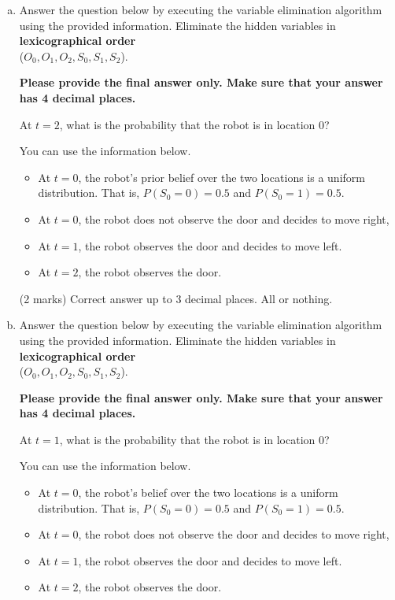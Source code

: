 \documentclass[12pt]{article}
\begin{document}
\begin{enumerate}[(a)]
\item 
\label{q1_filtering}
Answer the question below by executing the variable elimination algorithm using the provided information. 
Eliminate the hidden variables in {\bf lexicographical order} \\
($O_0, O_1, O_2, S_0, S_1, S_2$). 

{\bf Please provide the final answer only. Make sure that your answer has 4 decimal places.}

\begin{problem}
At $t=2$, what is the probability that the robot is in location $0$? 

You can use the information below.
\begin{itemize}
    \item At $t=0$, the robot's prior belief over the two locations is a uniform distribution. That is, $P(S_0 = 0) = 0.5$ and $P(S_0 = 1) = 0.5$.
    \item At $t=0$, the robot does not observe the door and decides to move right, 
    \item At $t=1$, the robot observes the door and decides to move left.
    \item At $t=2$, the robot observes the door.
\end{itemize}

\end{problem}



\begin{markscheme}
(2 marks) Correct answer up to 3 decimal places. All or nothing.

\end{markscheme}


\item
\label{q1_smoothing}
Answer the question below by executing the variable elimination algorithm using the provided information. 
Eliminate the hidden variables in {\bf lexicographical order} \\
($O_0, O_1, O_2, S_0, S_1, S_2$). 

{\bf Please provide the final answer only. Make sure that your answer has 4 decimal places.}

\begin{problem}
At $t=1$, what is the probability that the robot is in location $0$? 

You can use the information below.
\begin{itemize}
    \item At $t=0$, the robot's belief over the two locations is a uniform distribution. That is, $P(S_0 = 0) = 0.5$ and $P(S_0 = 1) = 0.5$.
    \item At $t=0$, the robot does not observe the door and decides to move right, 
    \item At $t=1$, the robot observes the door and decides to move left.
    \item At $t=2$, the robot observes the door.
\end{itemize}


\end{problem}
\end{enumerate}
\end{document}
